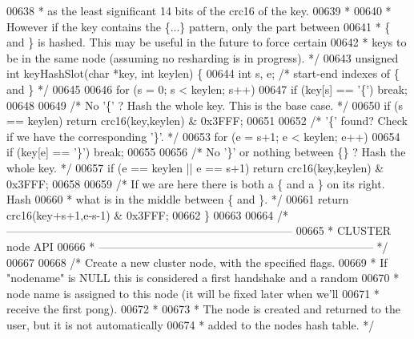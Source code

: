 \begin{DoxyCode}
{{{{{{{{{{{00638 \textcolor{comment}{ * as the least significant 14 bits of the crc16 of the key.}
00639 \textcolor{comment}{ *}
00640 \textcolor{comment}{ * However if the key contains the \{...\} pattern, only the part between}
00641 \textcolor{comment}{ * \{ and \} is hashed. This may be useful in the future to force certain}
00642 \textcolor{comment}{ * keys to be in the same node (assuming no resharding is in progress). */}
00643 \textcolor{keywordtype}{unsigned} \textcolor{keywordtype}{int} keyHashSlot(\textcolor{keywordtype}{char} *key, \textcolor{keywordtype}{int} keylen) \{
00644     \textcolor{keywordtype}{int} s, e; \textcolor{comment}{/* start-end indexes of \{ and \} */}
00645 
00646     \textcolor{keywordflow}{for} (s = 0; s < keylen; s++)
00647         \textcolor{keywordflow}{if} (key[s] == \textcolor{stringliteral}{'\{'}) \textcolor{keywordflow}{break};
00648 
00649     \textcolor{comment}{/* No '\{' ? Hash the whole key. This is the base case. */}
00650     \textcolor{keywordflow}{if} (s == keylen) \textcolor{keywordflow}{return} crc16(key,keylen) & 0x3FFF;
00651 
00652     \textcolor{comment}{/* '\{' found? Check if we have the corresponding '\}'. */}
00653     \textcolor{keywordflow}{for} (e = s+1; e < keylen; e++)
00654         \textcolor{keywordflow}{if} (key[e] == \textcolor{stringliteral}{'\}'}) \textcolor{keywordflow}{break};
00655 
00656     \textcolor{comment}{/* No '\}' or nothing between \{\} ? Hash the whole key. */}
00657     \textcolor{keywordflow}{if} (e == keylen || e == s+1) \textcolor{keywordflow}{return} crc16(key,keylen) & 0x3FFF;
00658 
00659     \textcolor{comment}{/* If we are here there is both a \{ and a \} on its right. Hash}
00660 \textcolor{comment}{     * what is in the middle between \{ and \}. */}
00661     \textcolor{keywordflow}{return} crc16(key+s+1,e-s-1) & 0x3FFF;
00662 \}
00663 
00664 \textcolor{comment}{/* -----------------------------------------------------------------------------}
00665 \textcolor{comment}{ * CLUSTER node API}
00666 \textcolor{comment}{ * -------------------------------------------------------------------------- */}
00667 
00668 \textcolor{comment}{/* Create a new cluster node, with the specified flags.}
00669 \textcolor{comment}{ * If "nodename" is NULL this is considered a first handshake and a random}
00670 \textcolor{comment}{ * node name is assigned to this node (it will be fixed later when we'll}
00671 \textcolor{comment}{ * receive the first pong).}
00672 \textcolor{comment}{ *}
00673 \textcolor{comment}{ * The node is created and returned to the user, but it is not automatically}
00674 \textcolor{comment}{ * added to the nodes hash table. */}
}}}}}}}}}}}
\end{DoxyCode}
